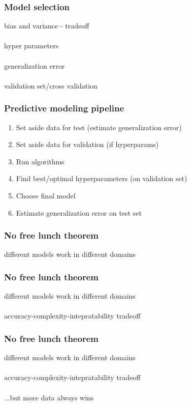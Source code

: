 \documentclass{beamer}
\begin{document}
\begin{frame}
	\frametitle{Model selection}
	\begin{center}
		bias and variance - tradeoff\\~\\
		hyper parameters\\~\\
		generalization error\\~\\
		validation set/cross validation
	\end{center}
\end{frame}

\begin{frame}
	\frametitle{Predictive modeling pipeline}
	\begin{center}
		\begin{enumerate}
			\item Set aside data for test (estimate generalization error)
			\item Set aside data for validation (if hyperparams)
			\item Run algorithms
			\item Find best/optimal hyperparameters (on validation set)
			\item Choose final model
			\item Estimate generalization error on test set
		\end{enumerate}
	\end{center}
\end{frame}

\begin{frame}
	\frametitle{No free lunch theorem}
	\begin{center}
		different models work in different domains
	\end{center}
\end{frame}

\begin{frame}
	\frametitle{No free lunch theorem}
	\begin{center}
		different models work in different domains\\~\\
		accuracy-complexity-intepratability tradeoff
	\end{center}
\end{frame}

\begin{frame}
	\frametitle{No free lunch theorem}
	\begin{center}
		different models work in different domains\\~\\
		accuracy-complexity-intepratability tradeoff\\~\\
		...but more data always wins
	\end{center}
\end{frame}
\end{document}
